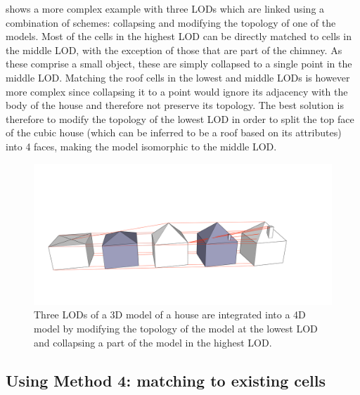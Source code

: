  shows a more complex example with three LODs which are linked using a combination of schemes: collapsing and modifying the topology of one of the models.
Most of the cells in the highest LOD can be directly matched to cells in the middle LOD, with the exception of those that are part of the chimney.
As these comprise a small object, these are simply collapsed to a single point in the middle LOD.\@
Matching the roof cells in the lowest and middle LODs is however more complex since collapsing it to a point would ignore its adjacency with the body of the house and therefore not preserve its topology.
The best solution is therefore to modify the topology of the lowest LOD in order to split the top face of the cubic house (which can be inferred to be a roof based on its attributes) into 4 faces, making the model isomorphic to the middle LOD.\@
\begin{figure}[tb]
   \centering
   \includegraphics[width=\linewidth]{figs/link1}
   \caption[Linking using multiple methods]{Three LODs of a 3D model of a house are integrated into a 4D model by modifying the topology of the model at the lowest LOD and collapsing a part of the model in the highest LOD.}
\label{fig:link1}
\end{figure}

\subsection{Using Method 4: matching to existing cells}

